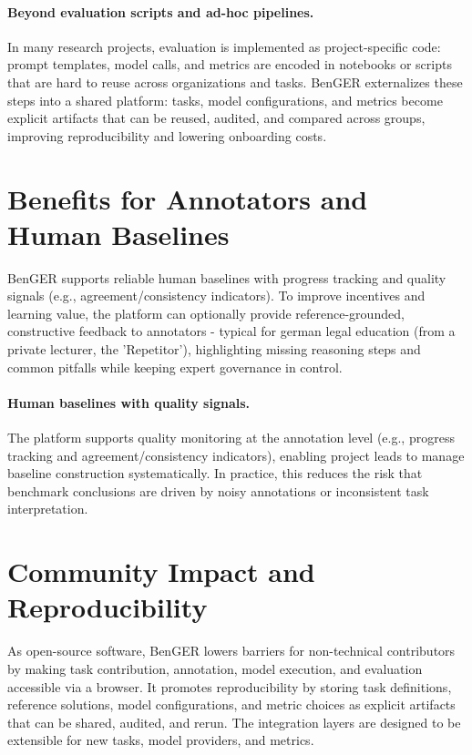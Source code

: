 \documentclass[sigconf]{acmart}
\begin{document}
\paragraph{Beyond evaluation scripts and ad-hoc pipelines.}
In many research projects, evaluation is implemented as project-specific code: prompt templates, model calls, and metrics are encoded in notebooks or scripts that are hard to reuse across organizations and tasks.
BenGER externalizes these steps into a shared platform: tasks, model configurations, and metrics become explicit artifacts that can be reused, audited, and compared across groups, improving reproducibility and lowering onboarding costs.

\section{Benefits for Annotators and Human Baselines}
BenGER supports reliable human baselines with progress tracking and quality signals (e.g., agreement/consistency indicators). To improve incentives and learning value, the platform can optionally provide reference-grounded, constructive feedback to annotators - typical for german legal education (from a private lecturer, the 'Repetitor'), highlighting missing reasoning steps and common pitfalls while keeping expert governance in control.

\paragraph{Human baselines with quality signals.}
The platform supports quality monitoring at the annotation level (e.g., progress tracking and agreement/consistency indicators), enabling project leads to manage baseline construction systematically. In practice, this reduces the risk that benchmark conclusions are driven by noisy annotations or inconsistent task interpretation.

\section{Community Impact and Reproducibility}
As open-source software, BenGER lowers barriers for non-technical contributors by making task contribution, annotation, model execution, and evaluation accessible via a browser. It promotes reproducibility by storing task definitions, reference solutions, model configurations, and metric choices as explicit artifacts that can be shared, audited, and rerun. The integration layers are designed to be extensible for new tasks, model providers, and metrics.
\end{document}

